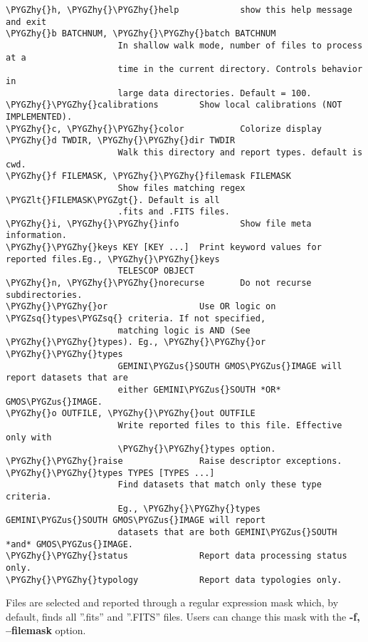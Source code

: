 \documentclass[letterpaper,10pt,english]{sphinxmanual}
\def\PYGZus{\char`\_}
\def\PYGZlt{\char`\<}
\def\PYGZgt{\char`\>}
\def\PYGZhy{\char`\-}
\def\PYGZsq{\char`\'}
\begin{document}
\begin{Verbatim}[commandchars=\\\{\}]
\PYGZhy{}h, \PYGZhy{}\PYGZhy{}help            show this help message and exit
\PYGZhy{}b BATCHNUM, \PYGZhy{}\PYGZhy{}batch BATCHNUM
                      In shallow walk mode, number of files to process at a
                      time in the current directory. Controls behavior in
                      large data directories. Default = 100.
\PYGZhy{}\PYGZhy{}calibrations        Show local calibrations (NOT IMPLEMENTED).
\PYGZhy{}c, \PYGZhy{}\PYGZhy{}color           Colorize display
\PYGZhy{}d TWDIR, \PYGZhy{}\PYGZhy{}dir TWDIR
                      Walk this directory and report types. default is cwd.
\PYGZhy{}f FILEMASK, \PYGZhy{}\PYGZhy{}filemask FILEMASK
                      Show files matching regex \PYGZlt{}FILEMASK\PYGZgt{}. Default is all
                      .fits and .FITS files.
\PYGZhy{}i, \PYGZhy{}\PYGZhy{}info            Show file meta information.
\PYGZhy{}\PYGZhy{}keys KEY [KEY ...]  Print keyword values for reported files.Eg., \PYGZhy{}\PYGZhy{}keys
                      TELESCOP OBJECT
\PYGZhy{}n, \PYGZhy{}\PYGZhy{}norecurse       Do not recurse subdirectories.
\PYGZhy{}\PYGZhy{}or                  Use OR logic on \PYGZsq{}types\PYGZsq{} criteria. If not specified,
                      matching logic is AND (See \PYGZhy{}\PYGZhy{}types). Eg., \PYGZhy{}\PYGZhy{}or \PYGZhy{}\PYGZhy{}types
                      GEMINI\PYGZus{}SOUTH GMOS\PYGZus{}IMAGE will report datasets that are
                      either GEMINI\PYGZus{}SOUTH *OR* GMOS\PYGZus{}IMAGE.
\PYGZhy{}o OUTFILE, \PYGZhy{}\PYGZhy{}out OUTFILE
                      Write reported files to this file. Effective only with
                      \PYGZhy{}\PYGZhy{}types option.
\PYGZhy{}\PYGZhy{}raise               Raise descriptor exceptions.
\PYGZhy{}\PYGZhy{}types TYPES [TYPES ...]
                      Find datasets that match only these type criteria.
                      Eg., \PYGZhy{}\PYGZhy{}types GEMINI\PYGZus{}SOUTH GMOS\PYGZus{}IMAGE will report
                      datasets that are both GEMINI\PYGZus{}SOUTH *and* GMOS\PYGZus{}IMAGE.
\PYGZhy{}\PYGZhy{}status              Report data processing status only.
\PYGZhy{}\PYGZhy{}typology            Report data typologies only.
\end{Verbatim}

Files are selected and reported through a regular expression mask which,
by default, finds all ''.fits'' and ''.FITS'' files. Users can change this mask
with the \textbf{-f, --filemask} option.
\end{document}
